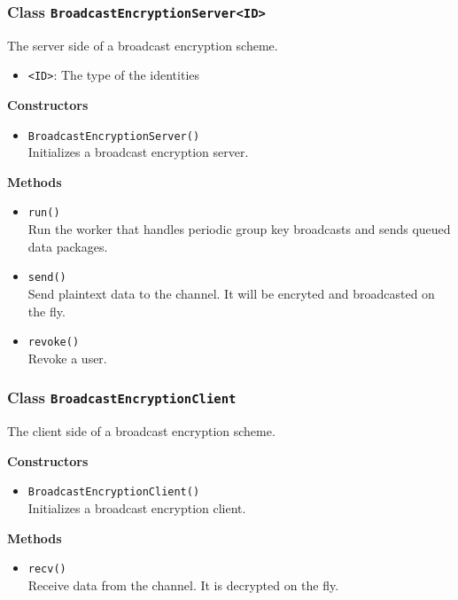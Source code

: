 \subsubsection{Class \lstinline|BroadcastEncryptionServer<ID>|}
The server side of a broadcast encryption scheme.
\begin{itemize}
\item \lstinline|<ID>|: The type of the identities
\end{itemize}

\textbf{Constructors}
\begin{itemize}
\item \lstinline|BroadcastEncryptionServer()| \\
Initializes a broadcast encryption server.

\end{itemize}

\textbf{Methods}
\begin{itemize}
\item \lstinline|run()| \\
Run the worker that handles periodic group key broadcasts and sends
 queued data packages.

\item \lstinline|send()| \\
Send plaintext data to the channel. It will be encryted and broadcasted
 on the fly.

\item \lstinline|revoke()| \\
Revoke a user.

\end{itemize}

\subsubsection{Class \lstinline|BroadcastEncryptionClient|}
The client side of a broadcast encryption scheme.

\textbf{Constructors}
\begin{itemize}
\item \lstinline|BroadcastEncryptionClient()| \\
Initializes a broadcast encryption client.

\end{itemize}

\textbf{Methods}
\begin{itemize}
\item \lstinline|recv()| \\
Receive data from the channel. It is decrypted on the fly.

\end{itemize}

